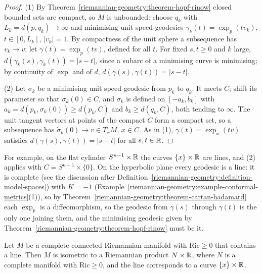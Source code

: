 \begin{proof}
(1) By Theorem~\ref{riemannian-geometry:theorem-hopf-rinow} closed bounded sets are compact, so $M$ is unbounded: choose $q_k$ with $L_k = d(p, q_k) \to \infty$ and minimising
unit speed geodesics $\gamma_k(t) = \exp_p(tv_k)$, $t \in [0, L_k]$, $|v_k| = 1$. By compactness of the unit sphere a subsequence has $v_k \to v$; let $\gamma(t) = \exp_p(tv)$, defined for
all $t$. For fixed $s, t \geq 0$ and $k$ large, $d(\gamma_k(s), \gamma_k(t)) = |s - t|$, since a subarc of a minimising curve is minimising; by continuity of $\exp$ and of $d$,
$d(\gamma(s), \gamma(t)) = |s - t|$.

(2) Let $\sigma_k$ be a minimising unit speed geodesic from $p_k$ to $q_k$. It meets $C$; shift its parameter so that $\sigma_k(0) \in C$, and $\sigma_k$ is defined on
$[-a_k, b_k]$ with $a_k = d(p_k, \sigma_k(0)) \geq d(p_k, C)$ and $b_k \geq d(q_k, C)$, both tending to $\infty$. The unit tangent vectors at points of the compact $C$ form a compact
set, so a subsequence has $\dot\sigma_k(0) \to v \in T_xM$, $x \in C$. As in (1), $\gamma(t) = \exp_x(tv)$ satisfies $d(\gamma(s), \gamma(t)) = |s - t|$ for all $s, t \in \mathbb{R}$.
\end{proof}

For example, on the flat cylinder $S^{n-1} \times \mathbb{R}$ the curves $\{x\} \times \mathbb{R}$ are lines, and (2) applies with $C = S^{n-1} \times \{0\}$. On the hyperbolic plane every
geodesic is a line: it is complete (see the discussion after Definition~\ref{riemannian-geometry:definition-model-spaces}) with $K = -1$
(Example~\ref{riemannian-geometry:example-conformal-metrics}(1)), so by Theorem~\ref{riemannian-geometry:theorem-cartan-hadamard} each $\exp_p$ is a diffeomorphism, so the geodesic from $\gamma(s)$ through $\gamma(t)$ is the only one joining them, and the minimising geodesic given by
Theorem~\ref{riemannian-geometry:theorem-hopf-rinow} must be it.

\begin{theorem}\label{riemannian-geometry:theorem-splitting}
Let $M$ be a complete connected Riemannian manifold with $\mathrm{Ric} \geq 0$ that contains a line. Then $M$ is isometric to a Riemannian product $N \times \mathbb{R}$, where $N$ is a
complete manifold with $\mathrm{Ric} \geq 0$, and the line corresponds to a curve $\{x\} \times \mathbb{R}$.
\end{theorem}


